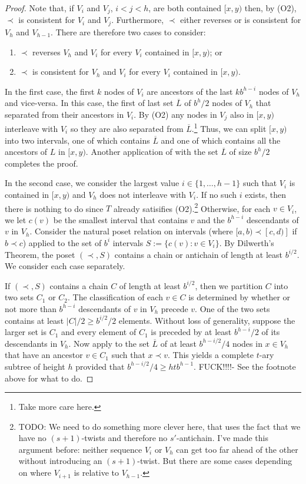 \documentclass[kpfonts]{patmorin}
\begin{document}
\begin{proof}
  Note that, if $V_i$ and $V_j$, $i<j<h$, are both contained $[x,y)$ then, by (O2), $\prec$ is consistent for $V_i$ and $V_j$.  Furthermore, $\prec$ either reverses or is consistent for $V_h$ and $V_{h-1}$.  There are therefore two cases to consider:
  \begin{enumerate}
    \item $\prec$ reverses $V_h$ and $V_i$ for every $V_i$ contained in $[x,y)$; or
    \item $\prec$ is consistent for $V_h$ and $V_i$ for every $V_i$ contained in $[x,y)$.
  \end{enumerate}
  In the first case, the first $k$ nodes of $V_i$ are ancestors of the last $kb^{h-i}$ nodes of $V_{h}$ and vice-versa.  In this case, the first of last set $\overline{L}$ of $b^{h}/2$ nodes of $V_h$ that separated from their ancestors in $V_i$.  By (O2) any nodes in $V_j$ also in $[x,y)$ interleave with $V_i$ so they are also separated from $\overline{L}$.\footnote{Take more care here.}  Thus, we can split $[x,y)$ into two intervals, one of which contains $\overline{L}$ and one of which contains all the ancestors of $L$ in $[x,y)$.  Another application of  with the set $\overline{L}$ of size $b^h/2$ completes the proof.
  
  In the second case, we consider the largest value $i\in\{1,\ldots,h-1\}$ such that $V_i$ is contained in $[x,y)$ and $V_h$ does not interleave with $V_i$. 
  If no such $i$ exists, then there is nothing to do since $T$ already satisifies (O2).\footnote{TODO: We need to do something more clever here, that uses the fact that we have no $(s+1)$-twists and therefore no $s'$-antichain. I've made this argument before: neither sequence $V_i$ or $V_h$ can get too far ahead of the other without introducing an $(s+1)$-twist.  But there are some cases depending on where $V_{i+1}$ is relative to $V_{h-1}$.}  Otherwise, for each $v\in V_i$, we let $c(v)$ be the smallest interval that contains $v$ and the $b^{h-i}$ descendants of $v$ in $V_h$.  Consider the natural poset relation on intervals (where $[a,b)\prec [c,d)]$ if $b\prec c$) applied to the set of $b^i$ intervals $S:=\{c(v):v\in V_i\}$.  By Dilwerth's Theorem, the poset $(\prec, S)$ contains a chain or antichain of length at least $b^{i/2}$.  We consider each case separately.
  
  If $(\prec,S)$ contains a chain $C$ of length at least $b^{i/2}$, then we partition $C$ into two sets $C_1$ or $C_2$. The classification of each $v\in C$ is determined by whether or not more than $b^{h-i}$ descendants of $v$ in $V_h$ precede $v$.  One of the two sets contains at least $|C|/2\ge b^{i/2}/2$ elements.  Without loss of generality, suppose the larger set is $C_1$ and every element of $C_1$ is preceded by at least $b^{h-i}/2$ of its descendants in $V_h$.  Now apply  to the set $\overline{L}$ of at least $b^{h-i/2}/4$ nodes in $x\in V_h$ that have an ancestor $v\in C_1$ such that $x\prec v$.  This yields a complete $t$-ary subtree of height $h$ provided that $b^{h-i/2}/4\ge htb^{h-1}$.  FUCK!!!!-  See the footnote above for what to do.
  

\end{proof}
\end{document}
